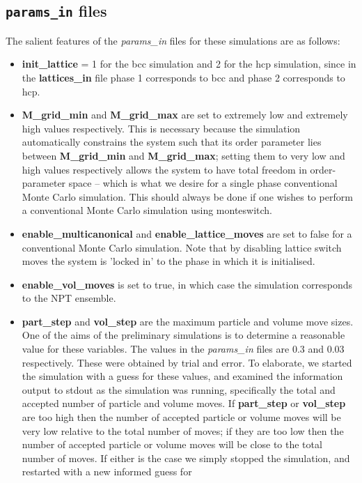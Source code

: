 \documentclass{report}
\begin{document}
\subsection{\texttt{params\_in} files}
The salient features of the \emph{params\_in} files for these simulations are as follows:
\begin{itemize}
\item \textbf{init\_lattice} = 1 for the bcc simulation and 2 for the hcp simulation, since in the \textbf{lattices\_in} file phase 1 corresponds to
  bcc and phase 2 corresponds to hcp.
\item \textbf{M\_grid\_min} and \textbf{M\_grid\_max} are set to extremely low and extremely high values respectively. This is necessary because
  the simulation automatically constrains the system such that its order parameter lies between \textbf{M\_grid\_min} and \textbf{M\_grid\_max};
  setting them to very low and high values respectively allows the system to have total freedom in order-parameter space --
  which is what we desire for a single phase conventional Monte Carlo simulation. This should always be done if one wishes
  to perform a conventional Monte Carlo simulation using monteswitch.
\item \textbf{enable\_multicanonical} and \textbf{enable\_lattice\_moves} are set to false for a conventional Monte Carlo simulation. Note that by
  disabling lattice switch moves the system is 'locked in' to the phase in which it is initialised.
\item \textbf{enable\_vol\_moves} is set to true, in which case the simulation corresponds to the NPT ensemble. 
\item \textbf{part\_step} and \textbf{vol\_step} are the maximum particle and volume move sizes. One of the aims of the preliminary simulations is
  to determine a reasonable value for these variables. The values in the \emph{params\_in} files are 0.3 and 0.03 respectively. These
  were obtained by trial and error. To elaborate, we started the simulation with a guess for these values, and examined the 
  information output to stdout as the simulation was running, specifically the total and accepted number of particle and 
  volume moves. If \textbf{part\_step} or \textbf{vol\_step} are too high then the number of accepted particle or volume moves will be very low 
  relative to the total number of moves; if they are too low then the number of accepted particle or volume moves will be close
  to the total number of moves. If either is the case we simply stopped the simulation, and restarted with a new informed guess for

\end{itemize}
\end{document}
